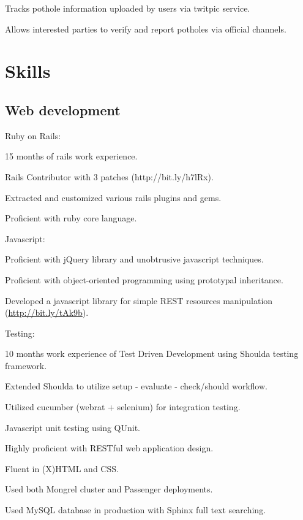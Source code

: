 \documentclass{resume}
\begin{document}
\begin{compactitem}
  \item Tracks pothole information uploaded by users via twitpic service.
  \item Allows interested parties to verify and report potholes via official channels.
\end{compactitem}

\section{Skills}

\subsection{Web development}

\begin{compactitem}
  \item Ruby on Rails:
    \begin{compactitem}
      \item 15 months of rails work experience.
      \item Rails Contributor with 3 patches \mbox{(http://bit.ly/h7lRx)}.
      \item Extracted and customized various rails plugins and gems.
      \item Proficient with ruby core language.
    \end{compactitem}

  \item Javascript:
    \begin{compactitem}
      \item Proficient with jQuery library and unobtrusive javascript techniques.
      \item Proficient with object-oriented programming using prototypal inheritance.
      \item Developed a javascript library for simple REST resources manipulation \mbox{(\url{http://bit.ly/tAk9b})}.
    \end{compactitem}

  \item Testing:
    \begin{compactitem}
      \item 10 months work experience of Test Driven Development using Shoulda testing framework.
      \item Extended Shoulda to utilize setup - evaluate - check/should workflow.
      \item Utilized cucumber (webrat + selenium) for integration testing.
      \item Javascript unit testing using QUnit.
    \end{compactitem}

  \item Highly proficient with RESTful web application design.
  \item Fluent in (X)HTML and CSS.
  \item Used both Mongrel cluster and Passenger deployments.
  \item Used MySQL database in production with Sphinx full text searching.
\end{compactitem}
\end{document}

